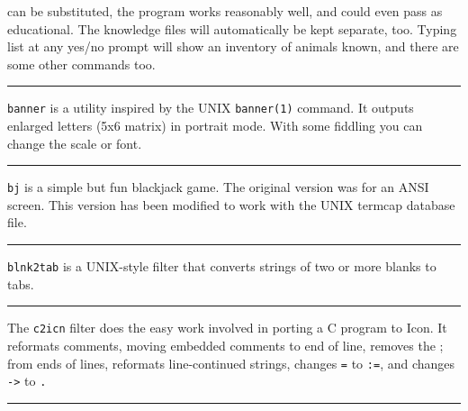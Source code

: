 {

can be substituted, the program works reasonably well, and could even
pass as educational. The knowledge files will automatically be kept
separate, too. Typing {\textquotedbl}list{\textquotedbl} at any yes/no
prompt will show an inventory of animals known, and there are some
other commands too. 

\vspace{0.25cm}\hrule{}

\texttt{banner} is a utility inspired by the UNIX \texttt{banner(1)}
command. It outputs enlarged letters (5x6 matrix) in portrait mode.
With some fiddling you can change the scale or font. 

\vspace{0.25cm}\hrule{}

\texttt{bj} is a simple but fun blackjack game. The original version was
for an ANSI screen. This version has been modified to work with the
UNIX termcap database file.

\vspace{0.25cm}\hrule{}

\texttt{blnk2tab} is a UNIX-style filter that converts strings of two or
more blanks to tabs.

\vspace{0.25cm}\hrule{}

The \texttt{c2icn} filter does the easy work involved in porting a C
program to Icon. It reformats comments, moving embedded
comments to end of line, removes the {\textquotedbl};{\textquotedbl}
from ends of lines, reformats line-continued strings, changes
\texttt{=} to \texttt{:=}, and changes \texttt{{}-{\textgreater}} to
\texttt{.} 

\vspace{0.25cm}\hrule{}

}
